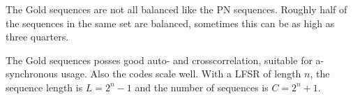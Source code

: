 The Gold sequences are not all balanced like the PN sequences. 
Roughly half of the sequences in the same set are balanced, sometimes this can be as high as three quarters. \cite{holmes2007spread}


The Gold sequences posses good auto- and crosscorrelation, suitable for a-synchronous usage.
Also the codes scale well.
With a LFSR of length $n$, the sequence length is $L = 2^n - 1$ and the number of sequences is $C = 2^n + 1$.











